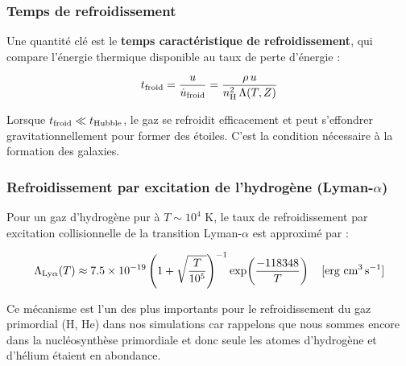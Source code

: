 \documentclass{article}
\begin{document}
\subsubsection{Temps de refroidissement}
Une quantité clé est le \textbf{temps caractéristique de refroidissement}, 
qui compare l'énergie thermique disponible au taux de perte d'énergie :

\begin{equation}
    t_{\rm froid} = \frac{u}{\dot{u}_{\rm froid}} 
    = \frac{\rho\, u}{n_{\rm H}^2\, \Lambda(T, Z)}
    \label{eq:tfroid}
\end{equation}

\noindent Lorsque $t_{\rm froid} \ll t_{\rm Hubble}$, le gaz se refroidit efficacement et peut s'effondrer gravitationnellement pour former des étoiles. 
C'est la condition nécessaire à la formation des galaxies.

\subsubsection{Refroidissement par excitation de l'hydrogène (Lyman-$\alpha$)}

Pour un gaz d'hydrogène pur à $T \sim 10^4$ K, le taux de refroidissement 
par excitation collisionnelle de la transition Lyman-$\alpha$ est 
approximé par :

\begin{equation}
    \Lambda_{\rm Ly\alpha}(T) 
    \approx 7.5 \times 10^{-19} 
    \left(1 + \sqrt{\frac{T}{10^5}}\right)^{-1}
    \exp\!\left(\frac{-118348}{T}\right) 
    \quad [\text{erg cm}^3\,\text{s}^{-1}]
    \label{eq:lyalpha}
\end{equation}

\noindent Ce mécanisme est l'un des plus importants pour le refroidissement du gaz primordial (H, He) dans nos simulations car rappelons que nous sommes encore dans la nucléosynthèse primordiale et donc seule les atomes d’hydrogène et d’hélium étaient en abondance.
\end{document}
